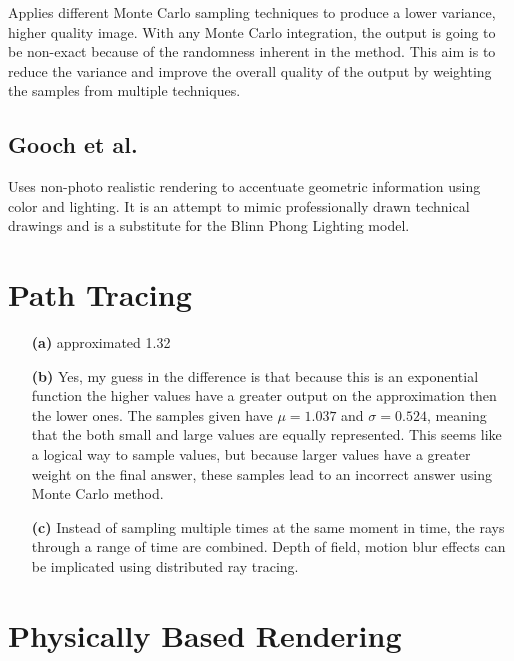 \documentclass{article}
\begin{document}
Applies different Monte Carlo sampling techniques to produce a lower variance, higher quality
image. With any Monte Carlo integration, the output is going to be non-exact because of the
randomness inherent in the method. This aim is to reduce the variance and improve the overall
quality of the output by weighting the samples from multiple techniques.

\subsection{Gooch et al.}

Uses non-photo realistic rendering to accentuate geometric information using color and lighting.
It is an attempt to mimic professionally drawn technical drawings and is a substitute for
the Blinn Phong Lighting model.

\section{Path Tracing}

\begin{itemize}
    \item[\textbf{(a)}] approximated 1.32
    \item[\textbf{(b)}] Yes, my guess in the difference is that because this is an exponential function
        the higher values have a greater output on the approximation then the lower ones. The samples
        given have $\mu = 1.037$ and $\sigma = 0.524$, meaning that the both small and large values are
        equally represented. This seems like a logical way to sample values, but because larger values have a
        greater weight on the final answer, these samples lead to an incorrect answer using Monte
        Carlo method.
    \item[\textbf{(c)}] Instead of sampling multiple times at the same moment in time, the rays through
        a range of time are combined. Depth of field, motion blur effects can be implicated using distributed
        ray tracing.
\end{itemize}

\section{Physically Based Rendering}
\end{document}
